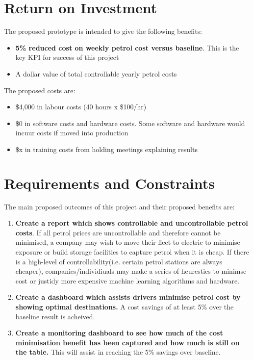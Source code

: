 \documentclass[10pt]{article} %
\begin{document}
\section{Return on Investment}
The proposed prototype is intended to give the following benefits:
\begin{itemize}
\item\textbf{ 5\% reduced cost on weekly petrol cost versus baseline}. This is the key KPI for success of this project
\item A dollar value of total controllable yearly petrol costs
\end{itemize}
The proposed costs are:
\begin{itemize}
\item \$4,000 in labour costs (40 hours x \$100/hr)
\item \$0 in software costs and hardware costs. Some software and hardware would incuur costs if moved into production
\item \$x in training costs from holding meetings explaining results
\end{itemize}
\section{ Requirements and Constraints}
The main proposed outcomes of this project and their proposed benefits are:
\begin{enumerate}
\item \textbf{Create a report which shows controllable and uncontrollable petrol costs}. If all petrol prices are uncontrollable and therefore cannot be minimised, a company may wish to move their fleet to electric to minimise exposure or build storage facilities to capture petrol when it is cheap. If there is a high-level of controllability(i.e. certain petrol stations are always cheaper), companies/individiuals may make a series of heurestics to minimse cost or justidy more expensive machine learning algorithms and hardware.
\item \textbf{Create a dashboard which assists drivers minimise petrol cost by showing optimal destinations.} A cost savings of at least 5\% over the baseline result is acheived.
\item \textbf{Create a monitoring dashboard to see how much of the cost minimisation benefit has been captured and how much is still on the table.} This will assist in reaching the 5\% savings over  baseline.
\end{enumerate}
\end{document}
